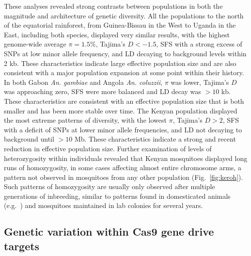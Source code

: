 \begin{refsection}
These analyses revealed strong contrasts between populations in both the magnitude and architecture of genetic diversity.
%
All the populations to the north of the equatorial rainforest, from Guinea-Bissau in the West to Uganda in the East, including both species, displayed very similar results, with the highest genome-wide average $\pi = 1.5\%$, Tajima's $D < -1.5$, SFS with a strong excess of SNPs at low minor allele frequency, and LD decaying to background levels within 2 kb.
%
These characteristics indicate large effective population size and are also consistent with a major population expansion at some point within their history.
%
In both Gabon \textit{An. gambiae} and Angola \textit{An. coluzzii}, $\pi$ was lower, Tajima's $D$ was approaching zero, SFS were more balanced and LD decay was $> 10$ kb.
%
These characteristics are consistent with an effective population size that is both smaller and has been more stable over time.
%
The Kenyan population displayed the most extreme patterns of diversity, with the lowest $\pi$, Tajima's $D > 2$, SFS with a deficit of SNPs at lower minor allele frequencies, and LD not decaying to background until $> 10$ Mb.
%
These characteristics indicate a strong and recent reduction in effective population size.
%
Further examination of levels of heterozygosity within individuals revealed that Kenyan mosquitoes displayed long runs of homozygosity, in some cases affecting almost entire chromosome arms, a pattern not observed in mosquitoes from any other population (Fig.~\ref{fig:keroh}).
%
Such patterns of homozygosity are usually only observed after multiple generations of inbreeding, similar to patterns found in domesticated animals (e.g.~\cite{Purfield2012}) and mosquitoes maintained in lab colonies for several years.


\subsection{Genetic variation within Cas9 gene drive targets}\label{subsec:gene-drive}



\end{refsection}

